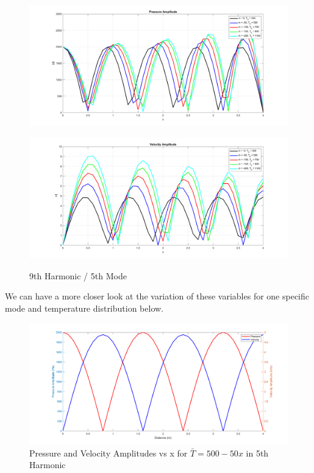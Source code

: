 \documentclass[8pt]{article} %
\begin{document}
\begin{figure}[H]
  \centering
  \begin{minipage}[b]{0.495\linewidth}
    \centering
    \includegraphics[width=\linewidth]{pvsx5}
    \label{fig:pvsx5}
  \end{minipage}
  \hfill
  \begin{minipage}[b]{0.495\linewidth}
    \centering
    \includegraphics[width=\linewidth]{vvsx5}
    \label{fig:vvsx5}
  \end{minipage}
\caption{9th Harmonic / 5th Mode}
\end{figure}

We can have a more closer look at the variation of these variables for one specific mode and temperature distribution below.
\begin{figure}[H]
    \centering
    \includegraphics[width=0.8\linewidth]{pv.png}
    \caption{Pressure and Velocity Amplitudes vs x for $\bar{T} = 500 - 50x$ in 5th Harmonic}
    \label{fig:pv3}
\end{figure}
\end{document}
